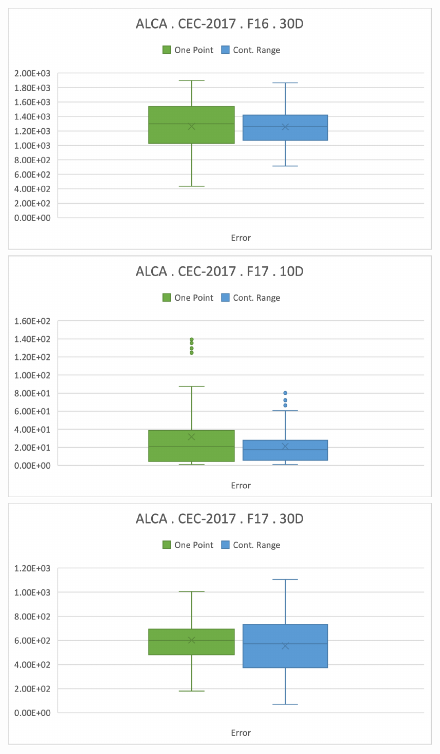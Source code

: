 \documentclass[graybox]{svmult}
\begin{document}
\begin{figure}[!ht]
\begin{minipage}[h]{0.49\linewidth}
        \end{minipage}
        \hfill
        \begin{minipage}[h]{0.49\linewidth}
            \includegraphics[width=1\linewidth]{img/fig_experiment_F16x30D.pdf} 
        \end{minipage}
        \vfill
        \vspace{0.05 cm}
        \begin{minipage}[h]{0.49\linewidth}
            \includegraphics[width=1\linewidth]{img/fig_experiment_F17x10D.pdf} 
        \end{minipage}
        \hfill
        \begin{minipage}[h]{0.49\linewidth}
            \includegraphics[width=1\linewidth]{img/fig_experiment_F17x30D.pdf} 

\end{minipage}
\end{figure}
\end{document}
